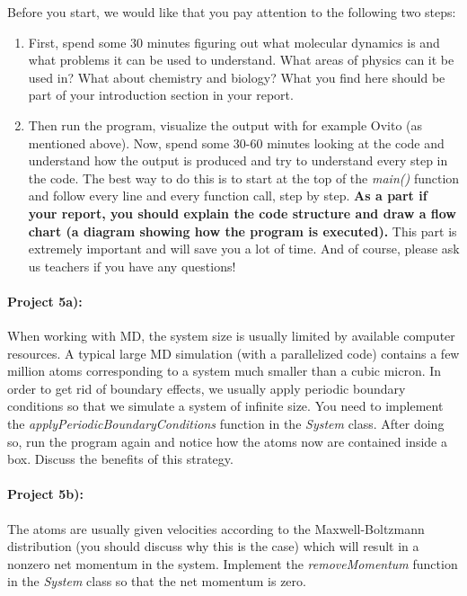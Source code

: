 \documentclass[%
oneside,                 %
final,                   %
10pt]{article}
\begin{document}
Before you start, we would like that you pay attention to the following two steps:
\begin{enumerate}
 \item First, spend some 30 minutes figuring out what molecular dynamics is and what problems it can be used to understand. What areas of physics can it be used in? What about chemistry and biology? What you find here should be part of your introduction section in your report.

 \item Then run the program, visualize the output with for example Ovito (as mentioned above). Now, spend some 30-60 minutes looking at the code and understand how the output is produced and try to understand every step in the code. The best way to do this is to start at the top of the \emph{main()} function and follow every line and every function call, step by step. \textbf{As a part if your report, you should explain the code structure and draw a flow chart (a diagram showing how the program is executed).} This part is extremely important and will save you a lot of time. And of course, please ask us teachers if you have any questions!
\end{enumerate}

\noindent
\paragraph{Project 5a):}
When working with MD, the system size is usually limited by available computer resources. A typical large MD simulation (with a parallelized code) contains a few million atoms corresponding to a system much smaller than a cubic micron. In order to get rid of boundary effects, we usually apply periodic boundary conditions so that we simulate a system of infinite size. You need to implement the \emph{applyPeriodicBoundaryConditions} function in the \emph{System} class. After doing so, run the program again and notice how the atoms now are contained inside a box. Discuss the benefits of this strategy.

\paragraph{Project 5b):}
The atoms are usually given velocities according to the Maxwell-Boltzmann distribution (you should discuss why this is the case) which will result in a nonzero net momentum in the system. Implement the \emph{removeMomentum} function in the \emph{System} class so that the net momentum is zero.
\end{document}
